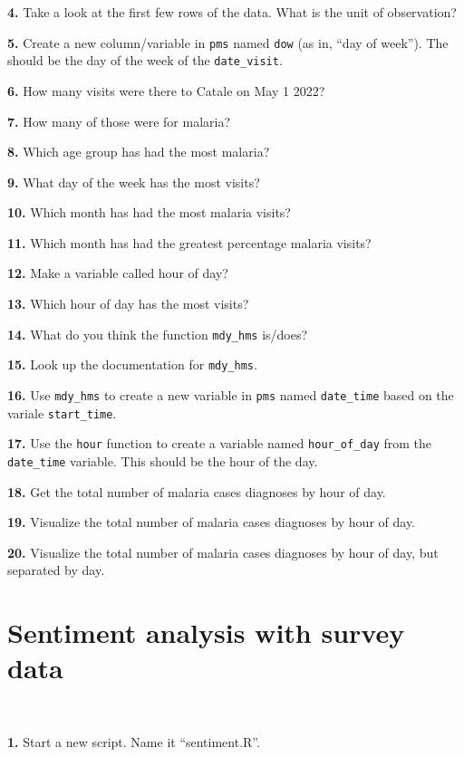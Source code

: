 \documentclass[]{book}
\begin{document}
\textbf{4.} Take a look at the first few rows of the data. What is the unit of observation?

\textbf{5.} Create a new column/variable in \texttt{pms} named \texttt{dow} (as in, ``day of week''). The should be the day of the week of the \texttt{date\_visit}.

\textbf{6.} How many visits were there to Catale on May 1 2022?

\textbf{7.} How many of those were for malaria?

\textbf{8.} Which age group has had the most malaria?

\textbf{9.} What day of the week has the most visits?

\textbf{10.} Which month has had the most malaria visits?

\textbf{11.} Which month has had the greatest percentage malaria visits?

\textbf{12.} Make a variable called hour of day?

\textbf{13.} Which hour of day has the most visits?

\textbf{14.} What do you think the function \texttt{mdy\_hms} is/does?

\textbf{15.} Look up the documentation for \texttt{mdy\_hms}.

\textbf{16.} Use \texttt{mdy\_hms} to create a new variable in \texttt{pms} named \texttt{date\_time} based on the variale \texttt{start\_time}.

\textbf{17.} Use the \texttt{hour} function to create a variable named \texttt{hour\_of\_day} from the \texttt{date\_time} variable. This should be the hour of the day.

\textbf{18.} Get the total number of malaria cases diagnoses by hour of day.

\textbf{19.} Visualize the total number of malaria cases diagnoses by hour of day.

\textbf{20.} Visualize the total number of malaria cases diagnoses by hour of day, but separated by day.

\hypertarget{sentiment-analysis-with-survey-data}{%
\chapter{Sentiment analysis with survey data}\label{sentiment-analysis-with-survey-data}}

~

\textbf{1.} Start a new script. Name it ``sentiment.R''.
\end{document}
